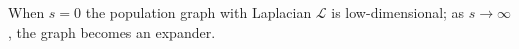 \documentclass[xcolor=dvipsnames]{beamer}
\begin{document}
\begin{frame}
  \centering
  When $s = 0$ the population graph with Laplacian $\mathcal{L}$ is
  low-dimensional; as $s \to \infty$, the graph becomes an expander.
\end{frame}
\end{document}

